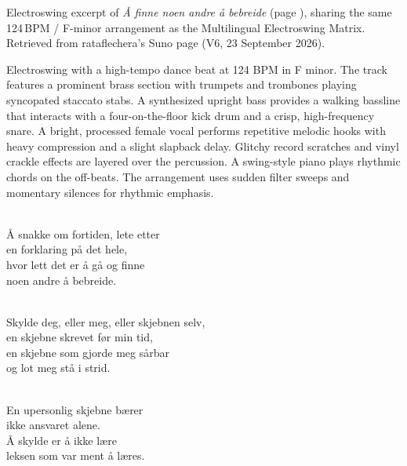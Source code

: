 
\begin{notes}
Electroswing excerpt of \emph{Å finne noen andre å bebreide} (page \pageref{sec:aa-finne-noen-andre-aa-bebreide}), sharing the same 124\,BPM / F-minor arrangement as the Multilingual Electroswing Matrix. Retrieved from rataflechera's Suno page (V6, 23 September 2026).
\end{notes}
\begin{style}
Electroswing with a high-tempo dance beat at 124 BPM in F minor. The track features a prominent brass section with trumpets and trombones playing syncopated staccato stabs. A synthesized upright bass provides a walking bassline that interacts with a four-on-the-floor kick drum and a crisp, high-frequency snare. A bright, processed female vocal performs repetitive melodic hooks with heavy compression and a slight slapback delay. Glitchy record scratches and vinyl crackle effects are layered over the percussion. A swing-style piano plays rhythmic chords on the off-beats. The arrangement uses sudden filter sweeps and momentary silences for rhythmic emphasis.
\end{style}
\begin{lyrics}
\\
Å snakke om fortiden, lete etter
\\
en forklaring på det hele,
\\
hvor lett det er å gå og finne\\
noen andre å bebreide.

\\
Skylde deg, eller meg, eller skjebnen selv,\\
en skjebne skrevet før min tid,\\
en skjebne som gjorde meg sårbar\\
og lot meg stå i strid.

\\
En upersonlig skjebne bærer\\
ikke ansvaret alene.\\
Å skylde er å ikke lære\\
leksen som var ment å læres.
\end{lyrics}

